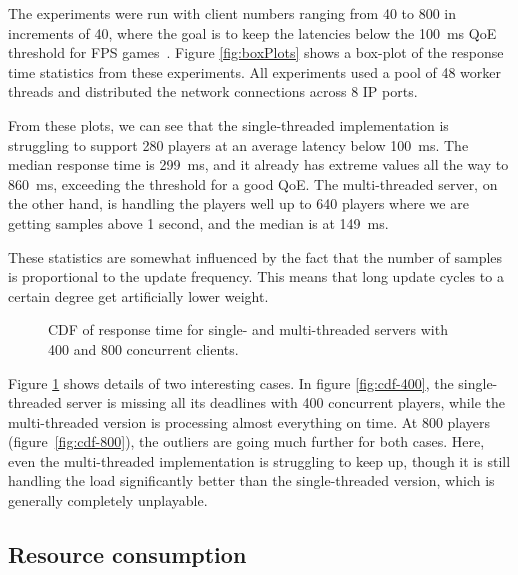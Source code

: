 The experiments were run with client numbers ranging from 40 to 800 in
increments of 40, where the goal is to keep the latencies below the
100~ms QoE threshold for FPS games~\cite{claypool++-2006}. Figure
\ref{fig:boxPlots} shows a box-plot of the response time statistics
from these experiments. All experiments used a pool of 48 worker
threads and distributed the network connections across 8 IP ports.

From these plots, we can see that the single-threaded implementation
is struggling to support 280 players at an average latency below
100~ms. The median response time is 299~ms, and it already has
extreme values all the way to 860~ms, exceeding the threshold for a good
QoE. The multi-threaded server, on the other hand, is handling the
players well up to 640 players where we are getting samples above 1
second, and the median is at 149~ms.

These statistics are somewhat influenced by the fact that the number of
samples is proportional to the update frequency. This means that long
update cycles to a certain degree get artificially lower weight.

\begin{figure}[t!]
  \centering 
  \vspace{-3mm}
  \caption{CDF of response time for single-  and multi-threaded
    servers with 400 and 800 concurrent clients.}
  \label{fig:CDFPlots}
\end{figure}

Figure \ref{fig:CDFPlots} shows details of two interesting cases. In
figure \ref{fig:cdf-400}, the single-threaded server is missing all
its deadlines with 400 concurrent players, while the multi-threaded
version is processing almost everything on time. At 800 players
(figure~\ref{fig:cdf-800}), the outliers are going much further for
both cases. Here, even the multi-threaded implementation is struggling
to keep up, though it is still handling the load significantly better
than the single-threaded version, which is generally completely
unplayable.
\subsection{Resource consumption}

